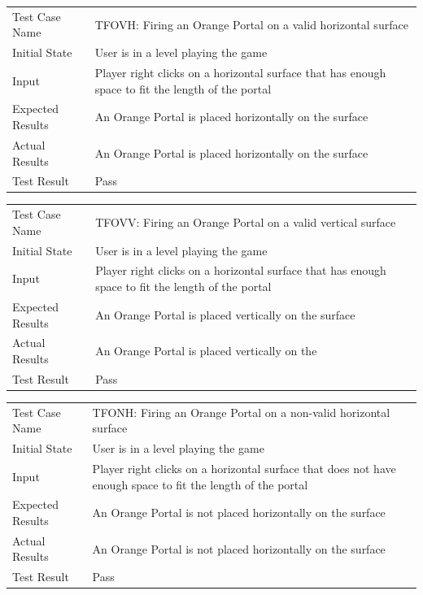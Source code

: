 \documentclass[12pt, titlepage]{article}
\begin{document}
\begin{center}
\begin{tabular}{ | l | p{10cm} | }
\hline
Test Case Name & TFOVH: Firing an Orange Portal on a valid horizontal surface	\\
Initial State & User is in a level playing the game	\\
Input & Player right clicks on a horizontal surface that has enough space to fit the length of the portal	\\
Expected Results & An Orange Portal is placed horizontally on the surface	\\
Actual Results & An Orange Portal is placed horizontally on the surface	\\
Test Result & Pass	\\
\hline
\end{tabular}
\end{center}

\begin{center}
\begin{tabular}{ | l | p{10cm} | }
\hline
Test Case Name & TFOVV: Firing an Orange Portal on a valid vertical surface	\\
Initial State & User is in a level playing the game	\\
Input & Player right clicks on a horizontal surface that has enough space to fit the length of the portal	\\
Expected Results & An Orange Portal is placed vertically on the surface	\\
Actual Results & An Orange Portal is placed vertically on the 	\\
Test Result & Pass	\\
\hline
\end{tabular}
\end{center}

\begin{center}
\begin{tabular}{ | l | p{10cm} | }
\hline
Test Case Name & TFONH: Firing an Orange Portal on a non-valid horizontal surface	\\
Initial State & User is in a level playing the game	\\
Input & Player right clicks on a horizontal surface that does not have enough space to fit the length of the portal	\\
Expected Results & An Orange Portal is not placed horizontally on the surface	\\
Actual Results & An Orange Portal is not placed horizontally on the surface	\\
Test Result & Pass	\\
\hline
\end{tabular}
\end{center}
\end{document}
